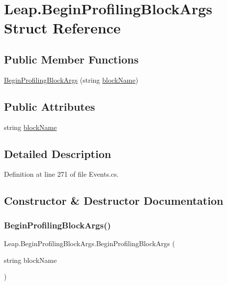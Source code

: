 \hypertarget{struct_leap_1_1_begin_profiling_block_args}{}\section{Leap.\+Begin\+Profiling\+Block\+Args Struct Reference}
\label{struct_leap_1_1_begin_profiling_block_args}
\subsection*{Public Member Functions}
\begin{DoxyCompactItemize}
\item 
\mbox{\hyperlink{struct_leap_1_1_begin_profiling_block_args_a408d4cfb6b557cca94e489ee922d245c}{Begin\+Profiling\+Block\+Args}} (string \mbox{\hyperlink{struct_leap_1_1_begin_profiling_block_args_acd3d10091043d45a9071d62de179aac5}{block\+Name}})
\end{DoxyCompactItemize}
\subsection*{Public Attributes}
\begin{DoxyCompactItemize}
\item 
string \mbox{\hyperlink{struct_leap_1_1_begin_profiling_block_args_acd3d10091043d45a9071d62de179aac5}{block\+Name}}
\end{DoxyCompactItemize}


\subsection{Detailed Description}


Definition at line 271 of file Events.\+cs.



\subsection{Constructor \& Destructor Documentation}
\mbox{\label{struct_leap_1_1_begin_profiling_block_args_a408d4cfb6b557cca94e489ee922d245c}} 
\subsubsection{\texorpdfstring{BeginProfilingBlockArgs()}{BeginProfilingBlockArgs()}}
{\footnotesize\ttfamily Leap.\+Begin\+Profiling\+Block\+Args.\+Begin\+Profiling\+Block\+Args (\begin{DoxyParamCaption}\item[{string}]{block\+Name }\end{DoxyParamCaption})}



